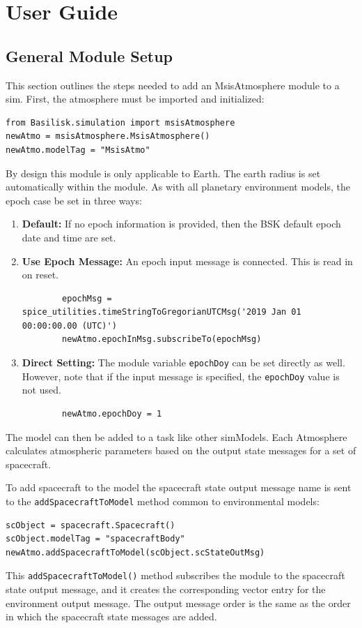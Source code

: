 
\section{User Guide}

\subsection{General Module Setup}
This section outlines the steps needed to add an MsisAtmosphere module to a sim.
First, the atmosphere must be imported and initialized:
\begin{verbatim}
from Basilisk.simulation import msisAtmosphere
newAtmo = msisAtmosphere.MsisAtmosphere()
newAtmo.modelTag = "MsisAtmo"
\end{verbatim}

By design this module is only applicable to Earth.  The earth radius is set automatically within the module.  As with all planetary environment models, the epoch case be set in three ways:
\begin{enumerate}
	\item  {\bfseries Default:} If no epoch information is provided, then the BSK default epoch date and time are set.
	\item  {\bfseries Use Epoch Message:}  An epoch input message  is connected.  This is read in on reset.
	\begin{verbatim}
		epochMsg = spice_utilities.timeStringToGregorianUTCMsg('2019 Jan 01 00:00:00.00 (UTC)')
		newAtmo.epochInMsg.subscribeTo(epochMsg)
	\end{verbatim}
	\item  {\bfseries Direct Setting:} The module variable {\tt epochDoy} can be set directly as well.  However, note that if the input message is specified, the {\tt epochDoy} value is not used.
	\begin{verbatim}
		newAtmo.epochDoy = 1
	\end{verbatim}
\end{enumerate}

The model can then be added to a task like other simModels. Each Atmosphere calculates atmospheric parameters based on the output state messages for a set of spacecraft.

To add spacecraft to the model the spacecraft state output message name is sent to the \verb|addSpacecraftToModel| method common to environmental models:
\begin{verbatim}
scObject = spacecraft.Spacecraft()
scObject.modelTag = "spacecraftBody"
newAtmo.addSpacecraftToModel(scObject.scStateOutMsg)
\end{verbatim}
This {\tt addSpacecraftToModel()} method subscribes the module to the spacecraft state output message, and it creates the  corresponding vector entry for the environment output message.  The output message order is the same as the order in which the spacecraft state messages are added.

